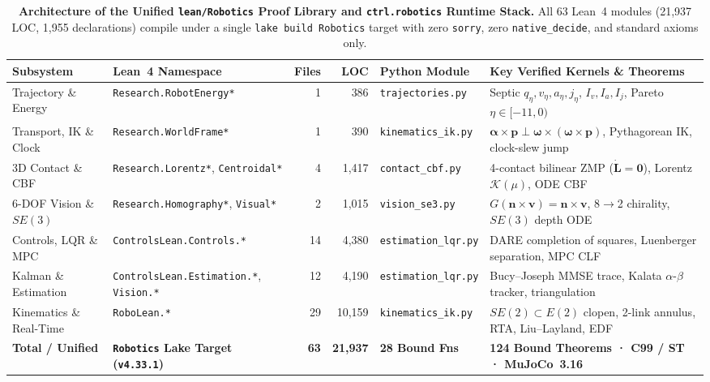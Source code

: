 \documentclass[10pt,twocolumn]{article}
\theoremstyle{definition}
\begin{document}
\begin{table}[t]
\centering
\caption{\textbf{Architecture of the Unified \texttt{lean/Robotics} Proof Library and \texttt{ctrl.robotics} Runtime Stack.} All 63 Lean~4 modules (21,937 LOC, 1,955 declarations) compile under a single \texttt{lake build Robotics} target with zero \texttt{sorry}, zero \texttt{native\_decide}, and standard axioms only.}
\label{tab:architecture}
\vspace{2pt}
\scriptsize
\setlength{\tabcolsep}{4pt}
\begin{tabular}{@{}llrrll@{}}
\toprule
\textbf{Subsystem} & \textbf{Lean~4 Namespace} & \textbf{Files} & \textbf{LOC} & \textbf{Python Module} & \textbf{Key Verified Kernels \& Theorems} \\
\midrule
Trajectory \& Energy & \texttt{Research.RobotEnergy*} & 1 & 386 & \texttt{trajectories.py} & Septic $q_\eta, v_\eta, a_\eta, j_\eta$, $I_v, I_a, I_j$, Pareto $\eta \in [-11, 0)$ \\
Transport, IK \& Clock & \texttt{Research.WorldFrame*} & 1 & 390 & \texttt{kinematics\_ik.py} & $\boldsymbol{\alpha}\times\mathbf{p} \perp \boldsymbol{\omega}\times(\boldsymbol{\omega}\times\mathbf{p})$, Pythagorean IK, clock-slew jump \\
3D Contact \& CBF & \texttt{Research.Lorentz*}, \texttt{Centroidal*} & 4 & 1,417 & \texttt{contact\_cbf.py} & 4-contact bilinear ZMP ($\dot{\mathbf{L}}=\mathbf{0}$), Lorentz $\mathcal{K}(\mu)$, ODE CBF \\
6-DOF Vision \& $SE(3)$ & \texttt{Research.Homography*}, \texttt{Visual*} & 2 & 1,015 & \texttt{vision\_se3.py} & $G(\mathbf{n}\times\mathbf{v})=\mathbf{n}\times\mathbf{v}$, 8$\to$2 chirality, $SE(3)$ depth ODE \\
Controls, LQR \& MPC & \texttt{ControlsLean.Controls.*} & 14 & 4,380 & \texttt{estimation\_lqr.py} & DARE completion of squares, Luenberger separation, MPC CLF \\
Kalman \& Estimation & \texttt{ControlsLean.Estimation.*}, \texttt{Vision.*} & 12 & 4,190 & \texttt{estimation\_lqr.py} & Bucy--Joseph MMSE trace, Kalata $\alpha$-$\beta$ tracker, triangulation \\
Kinematics \& Real-Time & \texttt{RoboLean.*} & 29 & 10,159 & \texttt{kinematics\_ik.py} & $SE(2) \subset E(2)$ clopen, 2-link annulus, RTA, Liu--Layland, EDF \\
\midrule
\textbf{Total / Unified} & \textbf{\texttt{Robotics} Lake Target (\texttt{v4.33.1})} & \textbf{63} & \textbf{21,937} & \textbf{28 Bound Fns} & \textbf{124 Bound Theorems · C99 / ST · MuJoCo~3.16} \\
\bottomrule
\end{tabular}
\end{table}
\end{document}
